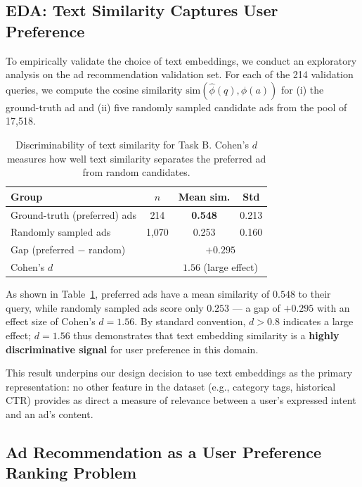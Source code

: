 \documentclass[10pt,twocolumn]{article}
\newcommand{\cosim}{\mathrm{sim}}
\begin{document}
\subsection{EDA: Text Similarity Captures User Preference}
\label{sec:motivation:eda}

To empirically validate the choice of text embeddings, we conduct an
exploratory analysis on the ad recommendation validation set.
For each of the 214 validation queries, we compute the cosine similarity
$\cosim(\hat{\phi}(q), \hat{\phi}(a))$ for (i) the ground-truth ad
and (ii) five randomly sampled candidate ads from the pool of 17{,}518.

\begin{table}[h]
\centering
\caption{Discriminability of text similarity for Task B.
         Cohen's $d$ measures how well text similarity separates
         the preferred ad from random candidates.}
\label{tab:eda}
\small
\begin{tabular}{lccc}
\toprule
Group & $n$ & Mean sim. & Std \\
\midrule
Ground-truth (preferred) ads & 214 & \textbf{0.548} & 0.213 \\
Randomly sampled ads         & 1{,}070 & 0.253 & 0.160 \\
\midrule
\multicolumn{2}{l}{Gap (preferred $-$ random)} & \multicolumn{2}{c}{$+0.295$} \\
\multicolumn{2}{l}{Cohen's $d$} & \multicolumn{2}{c}{$\mathbf{1.56}$ (large effect)} \\
\bottomrule
\end{tabular}
\end{table}

As shown in Table~\ref{tab:eda}, preferred ads have a mean similarity
of $0.548$ to their query, while randomly sampled ads score only $0.253$
--- a gap of $+0.295$ with an effect size of Cohen's $d = 1.56$.
By standard convention, $d > 0.8$ indicates a large effect;
$d = 1.56$ thus demonstrates that text embedding similarity is a
\textbf{highly discriminative signal} for user preference in this domain.

This result underpins our design decision to use text embeddings as the
primary representation: no other feature in the dataset (e.g., category
tags, historical CTR) provides as direct a measure of relevance between
a user's expressed intent and an ad's content.

\subsection{Ad Recommendation as a User Preference Ranking Problem}
\label{sec:motivation:ranking}
\end{document}
